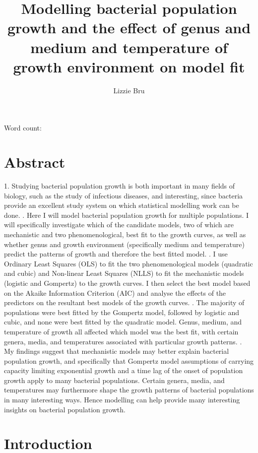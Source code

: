 \documentclass[11pt]{article}
\title{\textbf{Modelling bacterial population growth and the effect of genus and medium and temperature of growth environment on model fit}}
\author[1]{Lizzie Bru}
\affil[1]{School of Life Sciences, Imperial College London, Silwood Park Campus, Ascot SL5 7PY, UK}
\date{}
\newcommand{\quickwordcount}[1]{
		\begin{center}
			{\large Word count:
			}
		\end{center}
}
\begin{document}
	
	\maketitle
	\quickwordcount
	
	\newpage
	
	\section{Abstract}
	
	1. Studying bacterial population growth is both important in many fields of biology, such as the study of infectious diseases, and interesting, since bacteria provide an excellent study system on which statistical modelling work can be done.
	. Here I will model bacterial population growth for multiple populations. I will specifically investigate which of the candidate models, two of which are mechanistic and two phenomenological, best fit to the growth curves, as well as whether genus and growth environment (specifically medium and temperature) predict the patterns of growth and therefore the best fitted model. 
	. I use Ordinary Least Squares (OLS) to fit the two phenomenological models (quadratic and cubic) and Non-linear Least Squares (NLLS) to fit the mechanistic models (logistic and Gompertz) to the growth curves. I then select the best model based on the Akaike Information Criterion (AIC) and analyse the effects of the predictors on the resultant best models of the growth curves.
	. The majority of populations were best fitted by the Gompertz model, followed by logistic and cubic, and none were best fitted by the quadratic model. Genus, medium, and temperature of growth all affected which model was the best fit, with certain genera, media, and temperatures associated with particular growth patterns.
	. My findings suggest that mechanistic models may better explain bacterial population growth, and specifically that Gompertz model assumptions of carrying capacity limiting exponential growth and a time lag of the onset of population growth apply to many bacterial populations. Certain genera, media, and temperatures may furthermore shape the growth patterns of bacterial populations in many interesting ways. Hence modelling can help provide many interesting insights on bacterial population growth.
	
	
	\section{Introduction}
	
\end{document}
